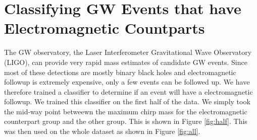 \documentclass[12pt]{article}
\begin{document}
\section{Classifying GW Events that have Electromagnetic Countparts}
\label{sec:classifier}
The GW observatory, the Laser Interferometer Gravitational Wave Observatory (LIGO), can provide very rapid mass estimates of candidate GW events. Since most of these detections are mostly binary black holes and electromagnetic followup is extremely expensive, only a few events can be followed up. We have therefore trained a classifier to determine if an event will have a electromagnetic followup. We trained this classifier on the first half of the data. We simply took the mid-way point betweewn the maximum chirp mass for the electromagnetic counterpart group and the other group. This is shown in Figure \ref{fig:half}. This was then used on the whole dataset as shown in Figure \ref{fig:all}.
\end{document}
